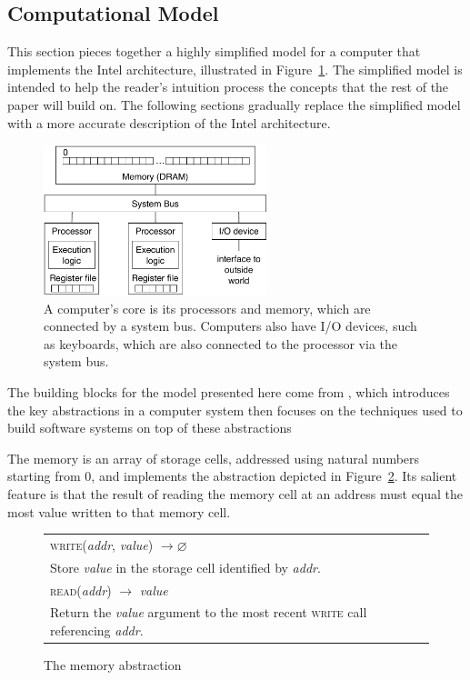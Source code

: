 \subsection{Computational Model}
\label{sec:resources}

This section pieces together a highly simplified model for a computer that
implements the Intel architecture, illustrated in
Figure~\ref{fig:computer_model}. The simplified model is intended to help the
reader's intuition process the concepts that the rest of the paper will build
on. The following sections gradually replace the simplified model with a more
accurate description of the Intel architecture.

\begin{figure}[hbt]
  \centering
  \includegraphics[width=65mm]{figures/computer_model.pdf}
  \caption{
    A computer's core is its processors and memory, which are connected by a
    system bus. Computers also have I/O devices, such as keyboards, which are
    also connected to the processor via the system bus.
  }
  \label{fig:computer_model}
\end{figure}


The building blocks for the model presented here come from
\cite{saltzer2009systemdesign}, which introduces the key abstractions in a
computer system then focuses on the techniques used to build software systems
on top of these abstractions

The memory is an array of storage cells, addressed using natural numbers
starting from 0, and implements the abstraction depicted in
Figure~\ref{fig:memory_abstraction}. Its salient feature is that the result of
reading the memory cell at an address must equal the most value written to that
memory cell.

\begin{figure}[hbt]
  \centering
  \begin{tabularx}{\columnwidth}{| X |}
  \hline
  \textsc{write}(\textit{addr}, \textit{value}) $ \rightarrow \varnothing $ \\
  Store \textit{value} in the storage cell identified by \textit{addr}. \\
  \hline
  \textsc{read}(\textit{addr}) $ \rightarrow $ \textit{value} \\
  Return the \textit{value} argument to the most recent \textsc{write} call
  referencing \textit{addr}. \\
  \hline
  \end{tabularx}
  \caption{The memory abstraction}
  \label{fig:memory_abstraction}
\end{figure}

